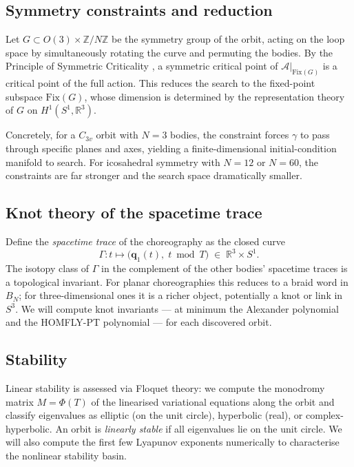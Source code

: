 \documentclass[12pt, a4paper]{article}
\theoremstyle{definition}
\newcommand{\R}{\mathbb{R}}
\newcommand{\q}{\mathbf{q}}
\newcommand{\Action}{\mathcal{A}}
\newcommand{\Z}{\mathbb{Z}}
\begin{document}
\subsection{Symmetry constraints and reduction}

Let $G \subset O(3) \times \Z/N\Z$ be the symmetry group of the orbit,
acting on the loop space by simultaneously rotating the curve and permuting
the bodies. By the Principle of Symmetric Criticality \cite{Palais1979},
a symmetric critical point of $\Action|_{\mathrm{Fix}(G)}$ is a critical
point of the full action. This reduces the search to the fixed-point
subspace $\mathrm{Fix}(G)$, whose dimension is determined by the
representation theory of $G$ on $H^1(S^1, \R^3)$.

Concretely, for a $C_{3v}$ orbit with $N=3$ bodies, the constraint forces
$\gamma$ to pass through specific planes and axes, yielding a finite-di\-men\-sional
initial-condition manifold to search. For icosahedral symmetry with
$N = 12$ or $N = 60$, the constraints are far stronger and the search space
dramatically smaller.

\subsection{Knot theory of the spacetime trace}

Define the \emph{spacetime trace} of the choreography as the closed curve
\[
  \Gamma : t \mapsto \bigl(\q_1(t),\; t \bmod T\bigr) \;\in\; \R^3 \times S^1.
\]
The isotopy class of $\Gamma$ in the complement of the other bodies'
spacetime traces is a topological invariant. For planar choreographies
this reduces to a braid word in $B_N$; for three-dimensional ones it is
a richer object, potentially a knot or link in $S^3$. We will compute
knot invariants — at minimum the Alexander polynomial and the HOMFLY-PT
polynomial — for each discovered orbit.

\subsection{Stability}

Linear stability is assessed via Floquet theory: we compute the monodromy
matrix $M = \Phi(T)$ of the linearised variational equations along the
orbit and classify eigenvalues as elliptic (on the unit circle), hyperbolic
(real), or complex-hyperbolic. An orbit is \emph{linearly stable} if all
eigenvalues lie on the unit circle. We will also compute the first few
Lyapunov exponents numerically to characterise the nonlinear stability
basin.
\end{document}
